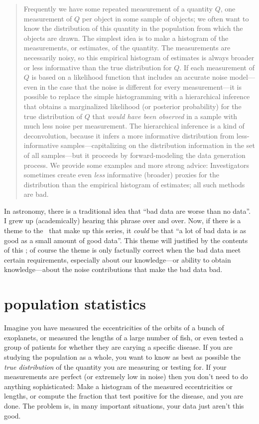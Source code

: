 \documentclass[12pt,twoside]{article}
\begin{document}
\begin{abstract}
Frequently we have some repeated measurement of a quantity $Q$, one
measurement of $Q$ per object in some sample of objects; we often want
to know the distribution of this quantity in the population from which
the objects are drawn.  The simplest idea is to make a histogram of
the measurements, or estimates, of the quantity.  The measurements are
necessarily noisy, so this empirical histogram of estimates is always
broader or less informative than the true distribution for $Q$.  If
each measurement of $Q$ is based on a likelihood function that
includes an accurate noise model---even in the case that the noise is
different for every measurement---it is possible to replace the simple
histogramming with a hierarchical inference that obtains a
marginalized likelihood (or posterior probability) for the true
distribution of $Q$ that \emph{would have been observed} in a sample
with much less noise per measurement.  The hierarchical inference is a
kind of deconvolution, because it infers a more informative
distribution from less-informative samples---capitalizing on the
distribution information in the set of all samples---but it proceeds
by forward-modeling the data generation process.  We provide some
examples and more strong advice: Investigators sometimes create even
\emph{less} informative (broader) proxies for the distribution than
the empirical histogram of estimates; all such methods are bad.
\end{abstract}

In astronomy, there is a traditional idea that ``bad data are worse
than no data''.  I grew up (academically) hearing this phrase over and
over.  Now, if there is a theme to the \documentnames\ that make up
this series, it \emph{could} be that ``a lot of bad data is as good as
a small amount of good data''.  This theme will justified by the
contents of this \documentname; of course the theme is only factually
correct when the bad data meet certain requirements, especially about
our knowledge---or ability to obtain knowledge---about the noise
contributions that make the bad data bad.

\section{population statistics}

Imagine you have measured the eccentricities of the orbits of a bunch
of exoplanets, or measured the lengths of a large number of fish, or
even tested a group of patients for whether they are carying a
specific disease.  If you are studying the population as a whole, you
want to know as best as possible the \emph{true distribution} of the
quantity you are measuring or testing for.  If your measurements are
perfect (or extremely low in noise) then you don't need to do anything
sophisticated: Make a histogram of the measured eccentricities or
lengths, or compute the fraction that test positive for the disease,
and you are done.  The problem is, in many important situations, your
data just aren't this good.
\end{document}
